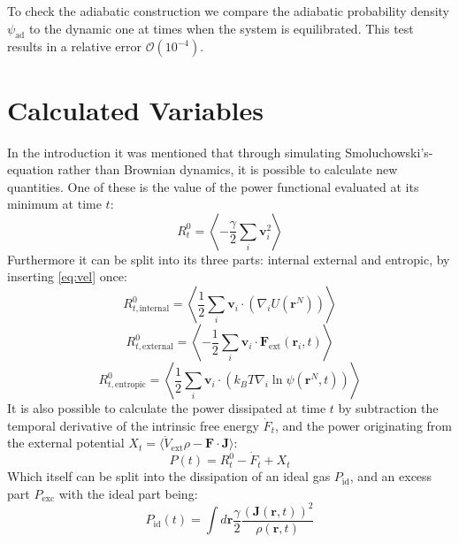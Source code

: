 \documentclass[a4paper]{article}
\renewcommand\vec[1]{\mathbf{#1}}
\begin{document}
To check the adiabatic construction we compare the adiabatic probability density $\psi_{\mathrm{ad}}$ to the dynamic one at times when the system is equilibrated. This test results in a relative error $\mathcal{O}(10^{-4})$.  

%
\section{Calculated Variables}
In the introduction it was mentioned that through simulating Smoluchowski's-equation rather than Brownian dynamics, it is possible to calculate new quantities. One of these is the value of the power functional evaluated at its minimum at time $t$:
\begin{equation}
	R^0_t=\left\langle -\frac{\gamma}{2} \sum_i \vec{v}_i^2 \right\rangle
	\label{eq:powerfunctional}
\end{equation}
Furthermore it can be split into its three parts: internal external and entropic, by inserting \cref{eq:vel} once:
\begin{equation}
	R^0_{t,\mathrm{internal}}=\left\langle \frac{1}{2} \sum_i \vec{v}_i \cdot \left(  \nabla_i U\left( \vec{r}^N \right)  \right) \right\rangle
	\label{eq:powerint}
\end{equation}
\begin{equation}
	R^0_{t,\mathrm{external}}=\left\langle -\frac{1}{2} \sum_i \vec{v}_i \cdot  \vec{F}_\mathrm{ext} \left( \vec{r}_i ,t \right)  \right\rangle
	\label{eq:powerext}
\end{equation}
\begin{equation}
	R^0_{t,\mathrm{entropic}}=\left\langle \frac{1}{2} \sum_i \vec{v}_i \cdot \left(   k_B T \nabla_i \ln \psi \left( \vec{r}^N ,t \right) \right) \right\rangle
	\label{eq:powerent}
\end{equation}
It is also possible to calculate the power dissipated at time $t$ by subtraction the  temporal derivative of the intrinsic free energy $\dot{F}_t$, and the power originating from the external potential $X_t=\langle\dot{V}_{\mathrm{ext}}\rho-\vec{F}\cdot \vec{J}\rangle$:
\begin{equation}
	P(t)=R^0_t-\dot{F}_t+X_t
	\label{eq:dissipation}
\end{equation}
Which itself can be split into the dissipation of an ideal gas $P_\mathrm{id}$, and an excess part $P_\mathrm{exc}$ with the ideal part being:
\begin{equation}
	P_\mathrm{id}(t)=\int d \vec{r} \frac{ \gamma}{2} \frac{\left( \vec{J}\left( \vec{r}, t \right) \right)^2}{ \rho\left( \vec{r}, t \right)} 
	\label{eq:dissipationideal}
\end{equation}
\end{document}
